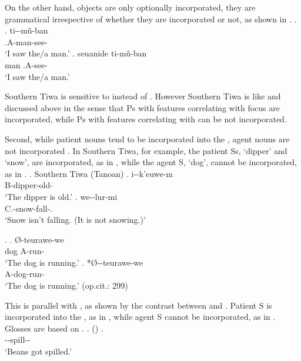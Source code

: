 On the other hand,
 objects are only optionally incorporated,
they are grammatical irrespective of whether they are incorporated or not,
as shown in \Next[a-b].
%
\ex.
 \ag. ti--m\~{u}-ban \\
      .{\sc A}-man-see- \\
      `I saw the/a man.'
 \bg. seuanide ti-m\~{u}-ban \\
      man .{\sc A}-see- \\
      `I saw the/a man.'
      \hfill{\cite[294-295]{allenetal84}}

Southern Tiwa is sensitive to  instead of .
However Southern Tiwa is like  and  discussed above
in the sense that
Ps with features correlating with focus are incorporated,
while Ps with features correlating with  can be not incorporated.


Second,
while patient nouns tend to be incorporated into the ,
agent nouns are not incorporated \cite{mithun84,baker88}.
In Southern Tiwa, for example,
the patient Ss, `dipper' and `snow', are incorporated, as in \Next,
while the agent S, `dog', cannot be incorporated, as in \NNext.
\ex. Southern Tiwa (Tanoan)
 \ag. {i--k'euwe-m} \\
	{\sc B}-{dipper}-old- \\
	`The dipper is old.'
 \bg. {we--lur-mi} \\
	{\sc C}.-{snow}-fall-. \\
	`Snow isn't falling. (It is not snowing.)' \hfill{\cite[300]{allenetal84}}
	
\ex.
 \ag. {} {{\O}-teurawe-we} \\
	{dog} {\sc A}-run- \\
	`The dog is running.'
 \bg. *{{\O}--teurawe-we} \\
	{\sc A}-{dog}-run- \\
	`The dog is running.' \hfill{(op.cit.: 299)}

This is parallel with , as shown by the contrast between \Next and \NNext.
Patient S is incorporated into the , as in \Next,
while agent S cannot be incorporated, as in \Next[b].
Glosses are based on .
%
\ex.  ()
 \ag.  \\
	--spill-- \\
	`Beans got spilled.'
	\hfill{\cite[15]{woodbury75}}

